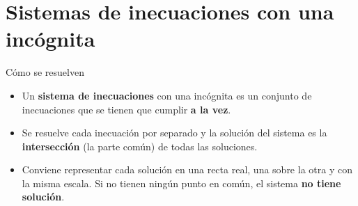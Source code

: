 \documentclass[11pt,a4paper]{article}
\begin{document}
\Needspace{5.7cm}
\section{Sistemas de inecuaciones con una incógnita}\hypertarget{sec6}{}
\begin{fmprop}{Cómo se resuelven}
\begin{itemize}
\item Un \textbf{sistema de inecuaciones} con una incógnita es un conjunto de inecuaciones que se tienen que cumplir \textbf{a la vez}.
\item Se resuelve cada inecuación por separado y la solución del sistema es la \textbf{intersección} (la parte común) de todas las soluciones.
\item Conviene representar cada solución en una recta real, una sobre la otra y con la misma escala. Si no tienen ningún punto en común, el sistema \textbf{no tiene solución}.
\end{itemize}
\end{fmprop}
\end{document}
